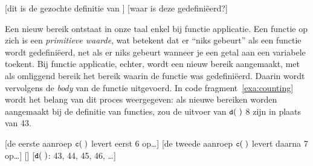 \begin{NoBreak}
\codeFragmentCaption
\begin{codelines}
  \codeLine{}
  [dit is de gezochte definitie van ]
  [waar is deze  gedefiniëerd?]
\end{codelines}
\end{NoBreak}


Een nieuw bereik ontstaat in onze taal enkel bij functie applicatie. Een functie op zich is een \emph{primitieve waarde}, wat betekent dat er ``niks gebeurt'' als een functie wordt gedefiniëerd, net als er niks gebeurt wanneer je een getal aan een variabele toekent. Bij functie applicatie, echter, wordt een nieuw bereik aangemaakt, met als omliggend bereik het bereik waarin de functie was gedefiniëerd. Daarin wordt vervolgens de \emph{body} van de functie uitgevoerd. In code fragment~\ref{exa:counting} wordt het belang van dit proces weergegeven: als nieuwe bereiken worden aangemaakt bij de definitie van functies, zou de uitvoer van $\text{\ttfamily\small\upshape d}(\;)$ 8 zijn in plaats van 43.

\begin{NoBreak}
\codeFragmentCaption
\begin{codelines}
  \codeLine{}
  [de eerste aanroep $\text{\ttfamily\small\upshape c}(\;)$ levert eerst 6 op\dots]
  [de tweede aanroep $\text{\ttfamily\small\upshape c}(\;)$ levert daarna 7 op\dots]
  \codeLine{}[]
  [$\text{\ttfamily\small\upshape d}(\;)$: 43, 44, 45, 46, \dots]
\end{codelines}
\end{NoBreak}


